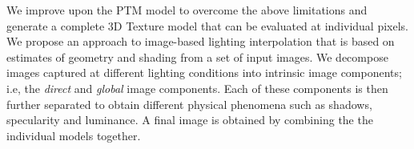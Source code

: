 We improve upon the PTM model to overcome the above limitations
and generate a complete 3D Texture model that can be evaluated at individual
pixels. We propose an approach to image-based lighting interpolation that is
based on estimates of geometry and shading from a set of input images. We
decompose images captured at different lighting conditions into intrinsic image
components; i.e, the {\em direct} and {\em global} image components. Each of
these components is then further separated to obtain different physical
phenomena such as shadows, specularity and luminance. A final image is obtained
by combining the the individual models together.

% 
% 



